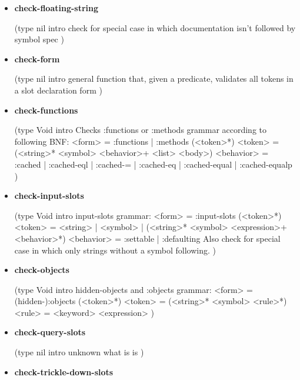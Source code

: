 \documentclass [11pt]{book}
\begin{document}
\begin{itemize}
\item {}
\label{prim:check-floating-string}
\textbf{check-floating-string}

(type nil intro
 check for special case in which documentation isn't followed by symbol spec
)



\item {}
\label{prim:check-form}
\textbf{check-form}

(type nil intro
 general function that, given a predicate, validates all tokens in a slot declaration form
)



\item {}
\label{prim:check-functions}
\textbf{check-functions}

(type Void intro
  Checks :functions or :methods grammar according to following BNF:
<form>  = :functions | :methods (<token>*)
<token> = (<string>* <symbol> <behavior>+ <list> <body>)
<behavior> = :cached | :cached-eql | :cached-= | :cached-eq | :cached-equal | :cached-equalp
)



\item {}
\label{prim:check-input-slots}
\textbf{check-input-slots}

(type Void intro  input-slots grammar: 
<form>     = :input-slots (<token>*)
<token>    = <string> | <symbol> | (<string>* <symbol> <expression>+ <behavior>*)
<behavior> = :settable | :defaulting
Also check for special case in which only strings without a symbol following.
)



\item {}
\label{prim:check-objects}
\textbf{check-objects}

(type Void intro  hidden-objects and :objects grammar: 
<form>  = (hidden-):objects (<token>*)
<token> = (<string>* <symbol> <rule>*)
<rule>  = <keyword> <expression>
)



\item {}
\label{prim:check-query-slots}
\textbf{check-query-slots}

(type nil intro unknown what is is
)



\item {}
\label{prim:check-trickle-down-slots}
\textbf{check-trickle-down-slots}


\end{itemize}
\end{document}
